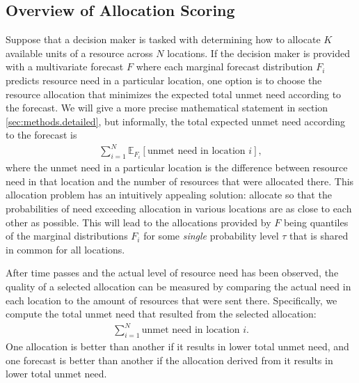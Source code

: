 \documentclass{article}\usepackage[]{graphicx}\usepackage[]{xcolor}
\begin{document}
\subsection{Overview of Allocation Scoring}
\label{sec:methods.overview}

Suppose that a decision maker is tasked with determining how to allocate $K$ available units of a resource across $N$ locations.
If the decision maker is provided with a multivariate forecast $F$ where each marginal forecast distribution $F_i$ predicts resource need in a particular location, one option is to choose the resource allocation that minimizes the expected total unmet need according to the forecast.
We will give a more precise mathematical statement in section \ref{sec:methods.detailed}, but informally, the total expected unmet need according to the forecast is{}
\begin{align}
\sum_{i=1}^N \mathbb{E}_{F_i}[\text{unmet need in location $i$}], \label{eqn:informal_objective}
\end{align}
where the unmet need in a particular location is the difference between resource need in that location and the number of resources that were allocated there.
This allocation problem has an intuitively appealing solution: allocate so that the probabilities of need exceeding allocation in various locations are as close to each other as possible.
This will lead to the allocations provided by $F$ being quantiles of the marginal distributions $F_i$ for some \emph{single} probability level $\tau$ that is shared in common for all locations.

After time passes and the actual level of resource need has been observed, the quality of a selected allocation can be measured by comparing the actual need in each location to the amount of resources that were sent there. Specifically, we compute the total unmet need that resulted from the selected allocation:
\begin{align}
    \sum_{i=1}^N \text{unmet need in location $i$}. \label{eqn:informal_loss}
\end{align}
One allocation is better than another if it results in lower total unmet need, and one forecast is better than another if the allocation derived from it results in lower total unmet need.
\end{document}
